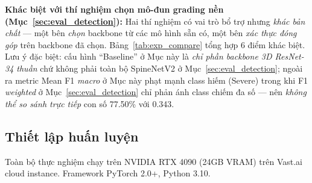\textbf{Khác biệt với thí nghiệm chọn mô-đun grading nền (Mục~\ref{sec:eval_detection}):} Hai thí nghiệm có vai trò bổ trợ nhưng \emph{khác bản chất} --- một bên \emph{chọn} backbone từ các mô hình sẵn có, một bên \emph{xác thực đóng góp} trên backbone đã chọn. Bảng~\ref{tab:exp_compare} tổng hợp 6 điểm khác biệt. Lưu ý đặc biệt: cấu hình ``Baseline'' ở Mục này là \emph{chỉ phần backbone 3D ResNet-34 thuần} chứ không phải toàn bộ SpineNetV2 ở Mục~\ref{sec:eval_detection}; ngoài ra metric Mean F1 \emph{macro} ở Mục này phạt mạnh class hiếm (Severe) trong khi F1 \emph{weighted} ở Mục~\ref{sec:eval_detection} chỉ phản ánh class chiếm đa số --- nên \emph{không thể so sánh trực tiếp} con số 77.50\% với 0.343.

\begin{table}[H]
\centering
\caption{So sánh hai thí nghiệm trong Chương 5.}
\label{tab:exp_compare}
\renewcommand{\arraystretch}{1.2}
\setlength{\tabcolsep}{4pt}
\end{table}

\subsection{Thiết lập huấn luyện}
Toàn bộ thực nghiệm chạy trên NVIDIA RTX 4090 (24GB VRAM) trên Vast.ai cloud instance. Framework PyTorch 2.0+, Python 3.10.

